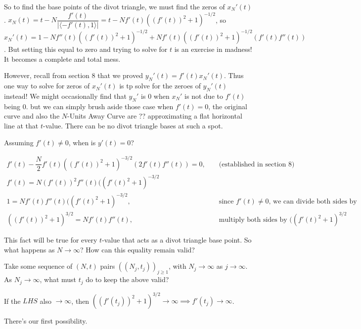 \renewcommand\bvec{\langle -f'(t), 1 \rangle}

So to find the base points of the divot triangle, we must find the zeros of $x_N'(t)$. $x_N(t) = t - N \dfrac{f'(t)}{| \bvec |} = t - N f'(t) ( (f'(t))^2 + 1 ) ^ { -1/2 }$, so $x_N'(t) = 1 - N f''(t) ( (f'(t))^2 + 1 ) ^ { -1/2 } + N f'(t) ( (f'(t))^2 + 1 ) ^ { -1/2 } ( f'(t) f''(t) )$. But setting this equal to zero and trying to solve for $t$ is an exercise in madness! It becomes a complete and total mess.

However, recall from section 8 that we proved $y_N'(t) = f'(t) x_N'(t)$. Thus one way to solve for zeros of $x_N'(t)$ is tp solve for the zeroes of $y_N'(t)$ instead! We might occasionally find that $y_N'$ is 0 when $x_N'$ is not due to $f'(t)$ being 0. but we can simply brush aside those case when $f'(t) = 0$, the original curve and also the $N$-Units Away Curve are ?? approximating a flat horizontal line at that $t$-value. There can be no divot triangle bases at such a spot.

Assuming $f'(t) \neq 0$, when is $y'(t) = 0$?

\begin{align*}
  f'(t) - \dfrac{N}{2} f'(t) ((f'(t))^2 + 1) ^ {-3/2} (2 f'(t) f''(t)) = 0, &
  &
  \text{ (established in section 8) } \\
  f'(t) = N (f'(t))^2 f''(t) ( (f'(t)^2 + 1 ) ^ {-3/2} \\
  1 = N f'(t) f''(t) ( (f'(t)^2 + 1 ) ^ {-3/2}, &
  &
  \text{ since $f'(t) \neq 0$, we can divide both sides by it } \\
  ( (f'(t))^2 + 1 ) ^ {3 / 2} = N f'(t) f''(t), &
  &
  \text{ multiply both sides by $((f'(t) ^ 2 + 1) ^ {3 / 2}$ }
\end{align*}

This fact will be true for every $t$-value that acts as a divot triangle base point. So what happens as $N \xrightarrow{} \infty$? How can this equality remain valid?

Take some sequence of $(N, t)$ pairs $((N_j, t_j))_{ j \geq 1}$, with $N_j \xrightarrow{} \infty$ as $j \xrightarrow{} \infty$. As $N_j \xrightarrow{} \infty$, what must $t_j$ do to keep the above valid?

If the $LHS$ also $\xrightarrow{} \infty$, then $((f'(t_j))^2 + 1) ^ {3/2} \xrightarrow{} \infty \implies f'(t_j) \xrightarrow{} \infty$.

There's our first possibility.

